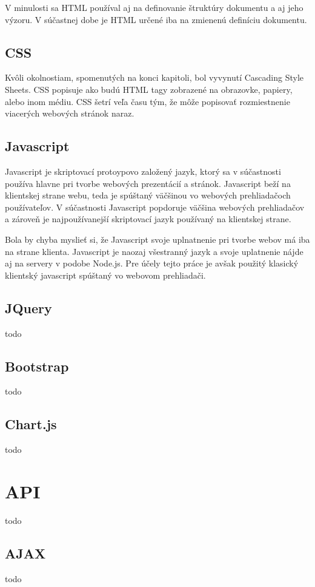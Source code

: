 V minulosti sa HTML používal aj na definovanie štruktúry dokumentu a aj jeho výzoru. V súčastnej dobe je HTML určené iba na zmienenú definíciu dokumentu.

\subsection{CSS}
Kvôli okolnostiam, spomenutých na konci kapitoli, bol vyvynutí Cascading Style Sheets. CSS popisuje ako budú HTML tagy zobrazené na obrazovke, papiery, alebo inom médiu. CSS šetrí veľa času tým, že môže popisovať rozmiestnenie viacerých webových stránok naraz.

\subsection{Javascript}
Javascript je skriptovací protoypovo založený jazyk, ktorý sa v súčastnosti používa hlavne pri tvorbe webových prezentácií a stránok. Javascript beží na klientskej strane webu, teda je spúštaný väčšinou vo webových prehliadačoch používateľov. V súčastnosti Javascript popdoruje väčšina webových prehliadačov a zároveň je najpoužívanejší skriptovací jazyk používaný na klientskej strane.

Bola by chyba myslieť si, že Javascript svoje uplnatnenie pri tvorbe webov má iba na strane klienta. Javascript je naozaj všestranný jazyk a svoje uplatnenie nájde aj na servery v podobe Node.js. Pre účely tejto práce je avšak použitý klasický klientský javascript spúštaný vo webovom prehliadači.


\subsection{JQuery}
todo

\subsection{Bootstrap}
todo

\subsection{Chart.js}
todo

\section{API}
todo

\subsection{AJAX}
todo

